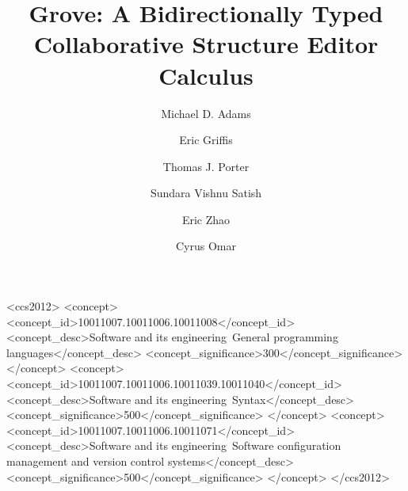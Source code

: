 \documentclass[acmsmall,dvipsnames,10pt]{acmart}\settopmatter{printfolios=true}
\begin{document}
\title{Grove: A Bidirectionally Typed Collaborative Structure Editor Calculus}

\author{Michael D. Adams}

\author{Eric Griffis}

\author{Thomas J. Porter}

\author{Sundara Vishnu Satish}

\author{Eric Zhao}

\author{Cyrus Omar}





\begin{CCSXML}
<ccs2012>
   <concept>
       <concept_id>10011007.10011006.10011008</concept_id>
       <concept_desc>Software and its engineering~General programming languages</concept_desc>
       <concept_significance>300</concept_significance>
       </concept>
   <concept>
       <concept_id>10011007.10011006.10011039.10011040</concept_id>
       <concept_desc>Software and its engineering~Syntax</concept_desc>
       <concept_significance>500</concept_significance>
       </concept>
   <concept>
       <concept_id>10011007.10011006.10011071</concept_id>
       <concept_desc>Software and its engineering~Software configuration management and version control systems</concept_desc>
       <concept_significance>500</concept_significance>
       </concept>
 </ccs2012>
\end{CCSXML}

\end{document}
